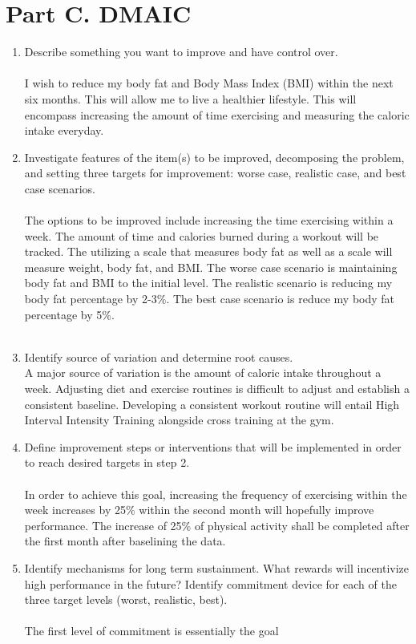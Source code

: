 \documentclass[12pt,letterpaper]{article}
\begin{document}
\section*{Part C. DMAIC}
    \begin{enumerate}
        \item Describe something you want to improve and have control over.\\\\
    I wish to reduce my body fat and Body Mass Index (BMI) within the next six months. This will allow me to live a healthier lifestyle. This will encompass increasing the amount of time exercising and measuring the caloric intake everyday. 
        \item Investigate features of the item(s) to be improved, decomposing the problem, and setting three targets for improvement: worse case, realistic case, and best case scenarios.\\\\
    The options to be improved include increasing the time exercising within a week. The amount of time and calories burned during a workout will be tracked. The utilizing a scale that measures body fat as well as a scale will measure weight, body fat, and BMI. The worse case scenario is maintaining body fat and BMI to the initial level. The realistic scenario is reducing my body fat percentage by 2-3\%. The best case scenario is reduce my body fat percentage by 5\%.\\ \\ 
        \item Identify source of variation and determine root causes.\\
    A major source of variation is the amount of caloric intake throughout a week. Adjusting diet and exercise routines is difficult to adjust and establish a consistent baseline. Developing a consistent workout routine will entail High Interval Intensity Training alongside cross training at the gym.\\ 
        \item Define improvement steps or interventions that will be implemented in order to reach desired targets in step 2.\\\\
    In order to achieve this goal, increasing the frequency of exercising within the week increases by 25\% within the second month will hopefully improve performance. The increase of 25\% of physical activity shall be completed after the first month after baselining the data.\\ 
        \item Identify mechanisms for long term sustainment. What rewards will incentivize high performance in the future? Identify commitment device for each of the three target levels (worst, realistic, best).\\\\
    The first level of commitment is essentially the goal 
    \end{enumerate}
\end{document}
